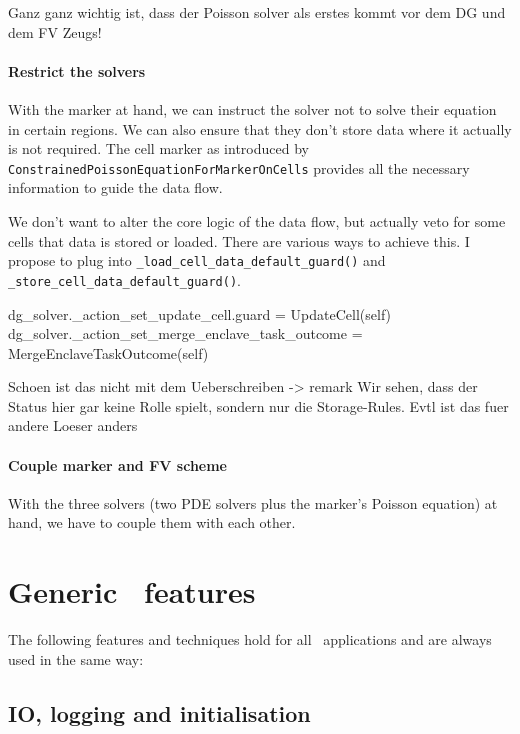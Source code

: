 Ganz ganz wichtig ist, dass der Poisson solver als erstes kommt vor dem DG und
dem FV Zeugs!


\paragraph*{Restrict the solvers}

With the marker at hand, we can instruct the solver not to solve their equation
in certain regions. 
We can also ensure that they don't store data where it actually is not required.
The cell marker as introduced by
\texttt{ConstrainedPoissonEquationForMarkerOnCells} provides all the necessary
information to guide the data flow.


We don't want to alter the core logic of the data flow, but actually veto for
some cells that data is stored or loaded. 
There are various ways to achieve this.
I propose to plug into \texttt{\_load\_cell\_data\_default\_guard()} and 
\texttt{\_store\_cell\_data\_default\_guard()}.

\begin{code}
dg_solver._action_set_update_cell.guard                = UpdateCell(self)
dg_solver._action_set_merge_enclave_task_outcome = MergeEnclaveTaskOutcome(self)                                                                                 
\end{code}

Schoen ist das nicht mit dem Ueberschreiben -> remark
Wir sehen, dass der Status hier gar keine Rolle spielt, sondern nur die
Storage-Rules. Evtl ist das fuer andere Loeser anders


\paragraph*{Couple marker and FV scheme}

With the three solvers (two PDE solvers plus the marker's Poisson equation) at
hand, we have to couple them with each other.
    


\section{Generic \ExaHyPE\ features}

The following features and techniques hold for all \ExaHyPE\ applications and
are always used in the same way:

\subsection{IO, logging and initialisation}
\label{exahype:io-logging-initialisation}



